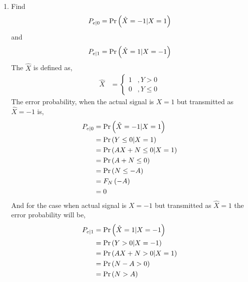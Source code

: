 \documentclass[journal,12pt,twocolumn]{IEEEtran}
\begin{document}
\begin{enumerate}[label=\thesection.\arabic*
,ref=\thesection.\theenumi]
\begin{enumerate}[label=\thesection.\arabic*
,ref=\thesection.\theenumi]
	\solution When $ Y > 0 $, we can more probably say that $X = 1$ as $X$ can take values from $\sbrak{-1,1}$.As $A$ increases the signal contribution will increase compared to noise.The scatter plot will not be intermixed as $A$ increases. So in this case, the scatter plot of $Y$ is seperated with decision boundary as $0$. So we can more probably say that,
	  \begin{align}
		  X &= \begin{cases}
			  1 &, Y>0\\
			 -1 &, Y<0 
		       \end{cases}
          \end{align}		       
\item
\label{ml-ch4_sim}
Find
\begin{equation}
	P_{e|0} = \Pr\left(\hat{X} = -1|X=1\right)
\end{equation}
and
\begin{equation}
	P_{e|1} = \Pr\left(\hat{X} = 1|X=-1\right)
\end{equation}
%
\solution The $\hat{X}$ is defined as,
  \begin{align}
      \hat{X} &= \begin{cases}
	             1  &, Y > 0\\
		         0  &, Y\leq 0
		         \end{cases}
  \end{align}
 The error probability, when the actual signal is $X=1$ but transmitted as $\hat{X} = -1$ is,
  \begin{align}
	  P_{e|0} &= \Pr\left(\hat{X} = -1|X=1\right)\\
	          &= \Pr\left( Y \leq 0| X= 1\right)\\
		  &= \Pr\left(AX + N \leq 0 | X=1\right)\\
		  &= \Pr\left( A + N \leq 0\right)\\
		  &= \Pr\left(N \leq -A\right)\\
		  &= F_{N}\left(-A\right)\\
		  &= 0 \label{eq-5.5.1}
  \end{align}
 And for the case when actual signal is $X=-1$ but transmitted as $\hat{X} = 1$ the error probability will be,
  \begin{align}
	  P_{e|1} &= \pr{\hat{X} = 1|X=-1}\\
                  &= \pr{ Y > 0| X=-1}\\
                  &= \pr{AX + N > 0 | X=1}\\
                  &= \pr{ N-A > 0}\\
                  &= \pr{N > A}\\

\end{align}
\end{enumerate}
\end{enumerate}
\end{document}
